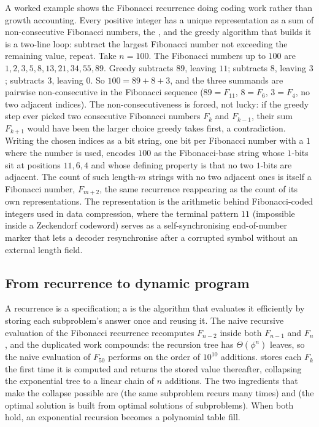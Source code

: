 A worked example shows the Fibonacci recurrence doing coding work rather
than growth accounting. Every positive integer has a unique
representation as a sum of non-consecutive Fibonacci numbers, the
, and the greedy algorithm that
builds it is a two-line loop: subtract the largest Fibonacci number not
exceeding the remaining value, repeat. Take $n = 100$. The Fibonacci
numbers up to $100$ are $1, 2, 3, 5, 8, 13, 21, 34, 55, 89$. Greedy
subtracts $89$, leaving $11$; subtracts $8$, leaving $3$; subtracts
$3$, leaving $0$. So $100 = 89 + 8 + 3$, and the three summands are
pairwise non-consecutive in the Fibonacci sequence ($89 = F_{11}$, $8 =
F_{6}$, $3 = F_{4}$, no two adjacent indices). The non-consecutiveness
is forced, not lucky: if the greedy step ever picked two consecutive
Fibonacci numbers $F_{k}$ and $F_{k-1}$, their sum $F_{k+1}$ would have
been the larger choice greedy takes first, a contradiction. Writing the
chosen indices as a bit string, one bit per Fibonacci number with a $1$
where the number is used, encodes $100$ as the Fibonacci-base string
whose $1$-bits sit at positions $11, 6, 4$ and whose defining property
is that no two $1$-bits are adjacent. The count of such length-$m$
strings with no two adjacent ones is itself a Fibonacci number, $F_{m +
2}$, the same recurrence reappearing as the count of its own
representations. The representation is the arithmetic behind
Fibonacci-coded integers used in data compression, where the terminal
pattern $11$ (impossible inside a Zeckendorf codeword) serves as a
self-synchronising end-of-number marker that lets a decoder resynchronise
after a corrupted symbol without an external length field.

\subsection{From recurrence to dynamic program}

A recurrence is a specification; a  is the
algorithm that evaluates it efficiently by storing each subproblem's
answer once and reusing it. The naive recursive evaluation of the
Fibonacci recurrence recomputes $F_{n-2}$ inside both $F_{n-1}$ and
$F_{n}$, and the duplicated work compounds: the recursion tree has
$\Theta(\phi^{n})$ leaves, so the naive evaluation of $F_{50}$
performs on the order of $10^{10}$ additions. 
stores each $F_{k}$ the first time it is computed and returns the
stored value thereafter, collapsing the exponential tree to a linear
chain of $n$ additions. The two ingredients that make the collapse
possible are  (the same subproblem
recurs many times) and  (the optimal
solution is built from optimal solutions of subproblems). When both
hold, an exponential recursion becomes a polynomial table fill.

